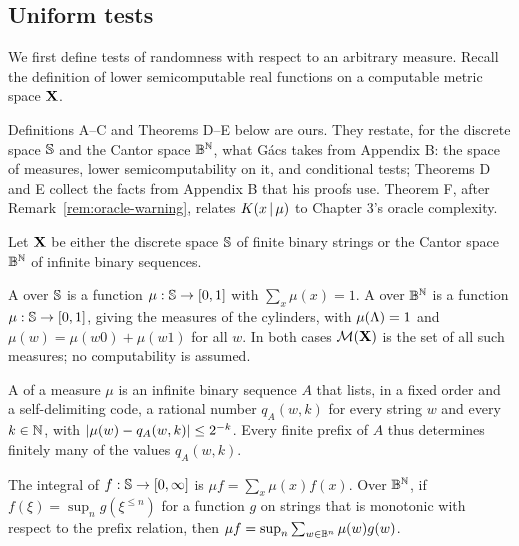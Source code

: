 \subsection{Uniform tests}

We first define tests of randomness with respect to an arbitrary measure.
Recall the definition of lower semicomputable
real functions on a computable metric space \( \mathbf{X} \).

\begin{formalization}
Definitions A--C and Theorems D--E below are ours. They restate, for the discrete space $\mathbb{S}$
and the Cantor space $\mathbb{B}^{\mathbb{N}}$, what G\'acs takes from Appendix B: the space of measures, lower
semicomputability on it, and conditional tests; Theorems D and E collect the facts from
Appendix B that his proofs use. Theorem F, after Remark~\ref{rem:oracle-warning}, relates
$K(x \,\vert\, \mu)$ to Chapter 3's oracle complexity.
\end{formalization}

\begin{ourdefinition}\label{our:measure}
Let \( \mathbf{X} \) be either the discrete space \( \mathbb{S} \) of finite binary strings or the Cantor
space \( \mathbb{B}^{\mathbb{N}} \) of infinite binary sequences.
 \begin{alphenum}
  \item A  over \( \mathbb{S} \) is a function \( \mu:\mathbb{S}\to[0,1] \) with
\( \sum_{x}\mu(x) = 1 \).
A  over \( \mathbb{B}^{\mathbb{N}} \) is a function \( \mu:\mathbb{S}\to[0,1] \), giving the
measures of the cylinders, with \( \mu(\Lambda) = 1 \) and \( \mu(w) = \mu(w0)+\mu(w1) \) for all
\( w \).
In both cases \( \mathcal{M}(\mathbf{X}) \) is the set of all such measures; no computability is assumed.
  \item A  of a measure \( \mu \) is an infinite binary sequence \( A \) that lists, in a
fixed order and a self-delimiting code, a rational number \( q_{A}(w,k) \) for every string
\( w \) and every \( k\in\mathbb{N} \), with \( |\mu(w)-q_{A}(w,k)| \le 2^{-k} \).
Every finite prefix of \( A \) thus determines finitely many of the values \( q_{A}(w,k) \).
  \item The integral of \( f:\mathbb{S}\to[0,\infty] \) is \( \mu f = \sum_{x}\mu(x)f(x) \).
Over \( \mathbb{B}^{\mathbb{N}} \), if \( f(\xi) = \sup_{n}g(\xi^{\le n}) \) for a function \( g \) on strings
that is monotonic with respect to the prefix relation, then
\( \mu f = \sup_{n}\sum_{w\in\mathbb{B}^{n}}\mu(w)g(w) \).
 \end{alphenum}
\end{ourdefinition}

